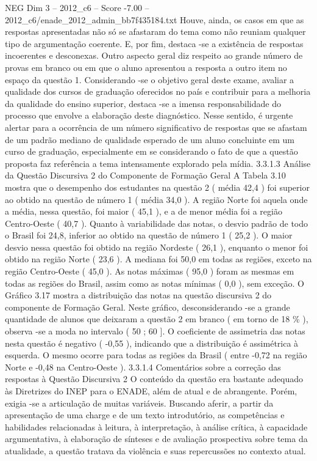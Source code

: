 \begin{textsample}{NEG Dim 3 – 2012\_c6 – Score -7.00 – 2012\_c6/enade\_2012\_admin\_bb7f435184.txt}
Houve, ainda, os casos em que as respostas apresentadas não só se afastaram do tema como não reuniam qualquer tipo de argumentação coerente.
E, por fim, destaca -se a existência de respostas incoerentes e desconexas.
Outro aspecto geral diz respeito ao grande número de provas em branco ou em que o aluno apresentou a resposta a outro item no espaço da questão 1.
Considerando -se o objetivo geral deste exame, avaliar a qualidade dos cursos de graduação oferecidos no país e contribuir para a melhoria da qualidade do ensino superior, destaca -se a imensa responsabilidade do processo que envolve a elaboração deste diagnóstico.
Nesse sentido, é urgente alertar para a ocorrência de um número significativo de respostas que se afastam de um padrão mediano de qualidade esperado de um aluno concluinte em um curso de graduação, especialmente em se considerando o fato de que a questão proposta faz referência a tema intensamente explorado pela mídia. 3.3.1.3 Análise da Questão Discursiva 2 do Componente de Formação Geral A Tabela 3.10 mostra que o desempenho dos estudantes na questão 2 ( média 42,4 ) foi superior ao obtido na questão de número 1 ( média 34,0 ).
A região Norte foi aquela onde a média, nessa questão, foi maior ( 45,1 ), e a de menor média foi a região Centro-Oeste ( 40,7 ).
Quanto à variabilidade das notas, o desvio padrão de todo o Brasil foi 24,8, inferior ao obtido na questão de número 1 ( 25,2 ).
O maior desvio nessa questão foi obtido na região Nordeste ( 26,1 ), enquanto o menor foi obtido na região Norte ( 23,6 ).
A mediana foi 50,0 em todas as regiões, exceto na região Centro-Oeste ( 45,0 ).
As notas máximas ( 95,0 ) foram as mesmas em todas as regiões do Brasil, assim como as notas mínimas ( 0,0 ), sem exceção.
O Gráfico 3.17 mostra a distribuição das notas na questão discursiva 2 do componente de Formação Geral.
Neste gráfico, desconsiderando -se a grande quantidade de alunos que deixaram a questão 2 em branco ( em torno de 18 \% ), observa -se a moda no intervalo ( 50 ; 60 ].
O coeficiente de assimetria das notas nesta questão é negativo ( -0,55 ), indicando que a distribuição é assimétrica à esquerda.
O mesmo ocorre para todas as regiões da Brasil ( entre -0,72 na região Norte e -0,48 na Centro-Oeste ). 3.3.1.4 Comentários sobre a correção das respostas à Questão Discursiva 2 O conteúdo da questão era bastante adequado às Diretrizes do INEP para o ENADE, além de atual e de abrangente.
Porém, exigia -se a articulação de muitas variáveis.
Buscando aferir, a partir da apresentação de uma charge e de um texto introdutório, as competências e habilidades relacionadas à leitura, à interpretação, à análise crítica, à capacidade argumentativa, à elaboração de sínteses e de avaliação prospectiva sobre tema da atualidade, a questão tratava da violência e suas repercussões no contexto atual.

\end{textsample}
